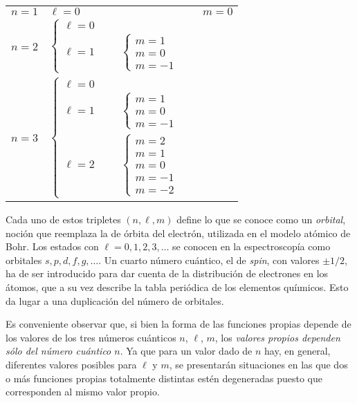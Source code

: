 \begin{center}
\begin{tabular}{l l l}
$n=1$ & $\ell=0$ & \hspace{-3.5cm} $m=0$ \\
$n=2$ & $\begin{cases}
\ell = 0 \\
\ell =1 \hspace{1cm} \begin{cases}
    m = 1 \\
    m = 0 \\
    m = -1
    \end{cases}
\end{cases}$ &  \\
$n=3$ & $\begin{cases}
    \ell = 0 \\
    \ell = 1 \hspace{1cm} \begin{cases}
        m = 1 \\
        m = 0 \\
        m = -1
    \end{cases} & \\
\ell = 2 \hspace{1cm} \begin{cases}
    m = 2 \\
    m = 1 \\
    m = 0 \\
    m = -1 \\
    m = -2
\end{cases} 
\end{cases}$ & 
\end{tabular}
\end{center}
Cada uno de estos tripletes $(n, \ell, m)$ define lo que se conoce como un \emph{orbital}, noción que reemplaza la de órbita del electrón, utilizada en el modelo atómico de Bohr. Los estados con $\ell = 0, 1, 2, 3, \ldots$ se conocen en la espectroscopía como orbitales $s, p, d, f, g, \ldots$. Un cuarto número cuántico, el de \textit{spin}, con valores $\pm 1/2$, ha de ser introducido para dar cuenta de la distribución de electrones en los átomos, que a su vez describe la tabla periódica de los elementos quíımicos. Esto da lugar a una duplicación del número de orbitales.
\par
Es conveniente observar que, si bien la forma de las funciones propias depende de los valores de los tres números cuánticos $n$, $\ell$, $m$, los \emph{valores propios dependen sólo del número cuántico $n$}. Ya que para un valor dado de $n$ hay, en general, diferentes valores posibles para $\ell$ y $m$, se presentarán situaciones en las que dos o más funciones propias totalmente distintas estén degeneradas puesto que corresponden al mismo valor propio.
